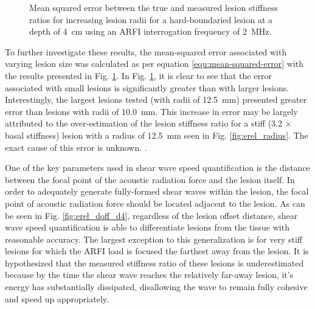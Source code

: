 			\begin{figure}[!htb]
				\centering
				\caption[Shear-wave speed quantified squared error related to lesion radius]{Mean squared error between the true and measured lesion stiffness ratios for increasing lesion radii for a hard-boundaried lesion at a depth of \SI{4}{\cm} using an ARFI interrogation frequency of \SI{2}{\MHz}.}
				\label{fig:erel_radius_mse}
			\end{figure}

			To further investigate these results, the mean-squared error associated with varying lesion size was calculated as per equation \ref{equ:mean-squared-error} with the results presented in Fig. \ref{fig:erel_radius_mse}. In Fig. \ref{fig:erel_radius_mse}, it is clear to see that the error associated with small lesions is significantly greater than with larger lesions. Interestingly, the largest lesions tested (with radii of \SI{12.5}{\mm}) presented greater error than lesions with radii of \SI{10.0}{\mm}. This increase in error may be largely attributed to the over-estimation of the lesion stiffness ratio for a stiff (3.2 $\times$ basal stiffness) lesion with a radius of \SI{12.5}{\mm} seen in Fig. \ref{fig:erel_radius}. The exact cause of this error is unknown. .

			One of the key parameters used in shear wave speed quantification is the distance between the focal point of the acoustic radiation force and the lesion itself. In order to adequately generate fully-formed shear waves within the lesion, the focal point of acoustic radiation force should be located adjacent to the lesion. As can be seen in Fig. \ref{fig:erel_doff_d4}, regardless of the lesion offset distance, shear wave speed quantification is able to differentiate lesions from the tissue with reasonable accuracy. The largest exception to this generalization is for very stiff lesions for which the ARFI load is focused the farthest away from the lesion. It is hypothesized that the measured stiffness ratio of these lesions is underestimated because by the time the shear wave reaches the relatively far-away lesion, it's energy has substantially dissipated, disallowing the wave to remain fully cohesive and speed up appropriately.

